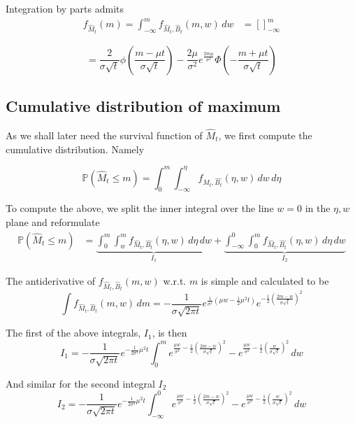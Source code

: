\documentclass[../Thesis.tex]{subfiles}
\begin{document}
Integration by parts admits
\begin{align*}
    f_{\hat{M}_t} (m) = \int_{-\infty}^m f_{\hat{M}_t, \hat{B}_t} (m,w)\, dw & = \left[\right]_{-\infty}^m
\end{align*}


$$= \frac{2}{\sigma \sqrt{t}} \phi \left(\frac{m-\mu t}{\sigma \sqrt{t}}\right) - \frac{2\mu}{\sigma^2} e^{\frac{2 m \mu}{\sigma^2}} \Phi\left( - \frac{m + \mu t}{\sigma \sqrt{t}} \right)$$




\subsection{Cumulative distribution of maximum}
As we shall later need the survival function of $\hat{M}_t$, we first compute the cumulative distribution. Namely

$$\mathbb{P}\left(\hat{M}_t \leq m\right) = \int_{0}^{m} \int_{-\infty}^{\eta} f_{\hat{M}_t, \hat{B_t}}(\eta,w) \, dw \, d\eta$$

To compute the above, we split the inner integral over the line $w=0$ in the $\eta, w$ plane and reformulate
\begin{align*}
    \mathbb{P}\left(\hat{M}_t \leq m\right) & = \underbrace{\int_{0}^{m} \int_{w}^{m} f_{\hat{M}_t, \hat{B_t}}(\eta,w) \, d\eta \, dw}_{I_1}  + \underbrace{\int_{-\infty}^{0} \int_{0}^{m} f_{\hat{M}_t, \hat{B_t}}(\eta,w) \, d\eta \, dw}_{I_2}
\end{align*}

The antiderivative of $f_{\hat{M}_t,\hat{B}_t}(m,w)$ w.r.t. $m$ is simple and calculated to be
$$\int f_{\hat{M}_t,\hat{B}_t}(m,w)\, dm = -\frac{1}{\sigma \sqrt{2\pi t}} e^{\frac{1}{\sigma^2} \left(\mu w - \frac{1}{2} \mu^2 t\right)} e^{-\frac{1}{2}\left(\frac{2m - w}{\sigma \sqrt{t}}\right)^2} $$

The first of the above integrals, $I_1$, is then
$$I_1 = -\frac{1}{\sigma \sqrt{2\pi t}} e^{-\frac{1}{2 \sigma^2} \mu^2 t } \int_0^m  e^{\frac{\mu w}{\sigma^2} - \frac{1}{2} \left(\frac{2m - w}{\sigma \sqrt{t}}\right)^2} - e^{\frac{\mu w}{\sigma^2} - \frac{1}{2} \left(\frac{w}{\sigma \sqrt{t}}\right)^2}  \, dw$$

And similar for the second integral $I_2$
$$I_2 = -\frac{1}{\sigma \sqrt{2\pi t}} e^{-\frac{1}{2 \sigma^2} \mu^2 t } \int_{-\infty}^0  e^{\frac{\mu w}{\sigma^2} - \frac{1}{2} \left(\frac{2m - w}{\sigma \sqrt{t}}\right)^2} - e^{\frac{\mu w}{\sigma^2} - \frac{1}{2} \left(\frac{w}{\sigma \sqrt{t}}\right)^2}  \, dw$$
\end{document}

